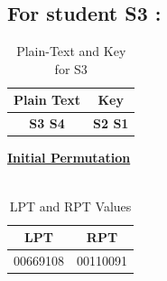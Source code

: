 \documentclass[12pt, letterpaper]{article}
\begin{document}
\subsection{{For student S3 :}}

\begin{table}[h]
    \centering
    \begin{tabular}{|c|c|}
        \hline
          Plain Text & Key \\
        \hline
        \textbf{S3 S4} & \textbf{S2 S1} \\
        \hline
    \end{tabular}
    \caption{Plain-Text and Key for S3}
    \label{tab:text-key}
\end{table}






\underline{\textbf{Initial Permutation}} \\
\\
\begin{table}[h]
    \centering
    \begin{tabular}{|c|c|}
        
        \hline
        LPT & RPT \\
        \hline
        00669108 & 00110091   \\
        \hline
    \end{tabular}
    \caption{LPT and RPT Values}
    \label{tab:lpt-rpt}
\end{table}
\end{document}

